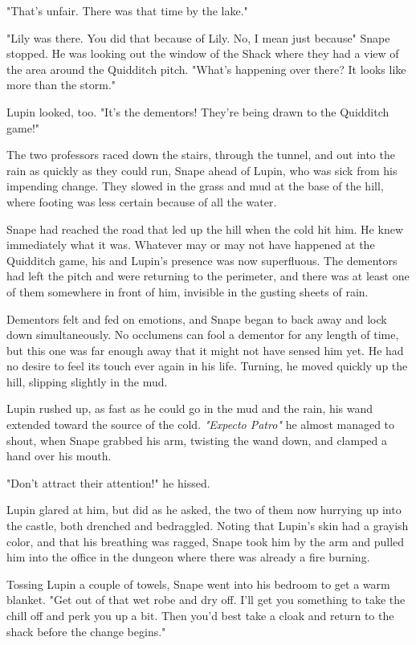 "That's unfair. There was that time by the lake."

"Lily was there. You did that because of Lily. No, I mean just because{\el}" Snape stopped. He was looking out the window of the Shack where they had a view of the area around the Quidditch pitch. "What's happening over there? It looks like more than the storm."

Lupin looked, too. "It's the dementors! They're being drawn to the Quidditch game!"

The two professors raced down the stairs, through the tunnel, and out into the rain as quickly as they could run, Snape ahead of Lupin, who was sick from his impending change. They slowed in the grass and mud at the base of the hill, where footing was less certain because of all the water.

Snape had reached the road that led up the hill when the cold hit him. He knew immediately what it was. Whatever may or may not have happened at the Quidditch game, his and Lupin's presence was now superfluous. The dementors had left the pitch and were returning to the perimeter, and there was at least one of them somewhere in front of him, invisible in the gusting sheets of rain.

Dementors felt and fed on emotions, and Snape began to back away and lock down simultaneously. No occlumens can fool a dementor for any length of time, but this one was far enough away that it might not have sensed him yet. He had no desire to feel its touch ever again in his life. Turning, he moved quickly up the hill, slipping slightly in the mud.

Lupin rushed up, as fast as he could go in the mud and the rain, his wand extended toward the source of the cold. \emph{"Expecto Patro{\el}"} he almost managed to shout, when Snape grabbed his arm, twisting the wand down, and clamped a hand over his mouth.

"Don't attract their attention!" he hissed.

Lupin glared at him, but did as he asked, the two of them now hurrying up into the castle, both drenched and bedraggled. Noting that Lupin's skin had a grayish color, and that his breathing was ragged, Snape took him by the arm and pulled him into the office in the dungeon where there was already a fire burning.

Tossing Lupin a couple of towels, Snape went into his bedroom to get a warm blanket. "Get out of that wet robe and dry off. I'll get you something to take the chill off and perk you up a bit. Then you'd best take a cloak and return to the shack before the change begins."

